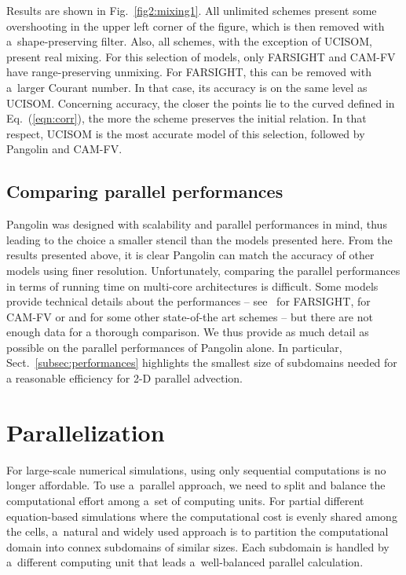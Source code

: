   Results are shown in Fig.~\ref{fig2:mixing1}. All unlimited schemes present some overshooting
  in the upper left corner of the figure, which is then removed with
  a~shape-preserving filter. Also, all schemes, with the exception of
  UCISOM, present real mixing. For this selection of models, only
  FARSIGHT and CAM-FV have range-preserving unmixing. For FARSIGHT,
  this can be removed with a~larger Courant number. In that case, its accuracy
  is on the same level as UCISOM.  Concerning accuracy, the closer the points
  lie to the curved defined in Eq.~(\ref{eqn:corr}), the more the scheme
  preserves the initial relation. In that respect, UCISOM is the most accurate
  model of this selection, followed by Pangolin and CAM-FV.

  \subsection{Comparing parallel performances}

  Pangolin was designed with scalability and parallel performances in mind, thus
  leading to the choice a smaller stencil than the models presented here.  From
  the results presented above, it is clear Pangolin can match the accuracy of
  other models using finer resolution. Unfortunately, comparing the parallel
  performances in terms of running time on multi-core architectures is difficult. Some
  models provide technical details about the performances --
  see~\cite{White2011} for FARSIGHT, \cite{Dennis2011} for CAM-FV or
  \citet{Erath2014} and \citet{Guba2014} for some other state-of-the art schemes -- but
  there are not enough data for a thorough comparison. We thus provide
  as much detail as possible on the parallel performances of Pangolin alone. In
  particular, Sect.~\ref{subsec:performances} highlights the smallest size of
  subdomains needed for a reasonable efficiency for 2-D parallel advection.

\section{Parallelization}
   \label{sec2:parallel}



   For large-scale numerical simulations, using only sequential computations is
   no longer affordable. To use a~parallel approach, we need to split and
   balance the computational effort among a~set of computing units.  For partial
   different equation-based simulations where the computational cost is evenly
   shared among the cells, a~natural and widely used approach is to partition
   the computational domain into connex subdomains of similar sizes. Each
   subdomain is handled by a~different computing unit that leads a~well-balanced
   parallel calculation.

